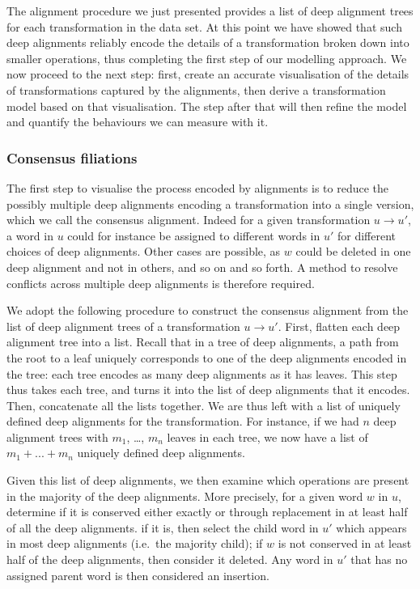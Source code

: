 The alignment procedure we just presented provides a list of deep
alignment trees for each transformation in the data set. At this point
we have showed that such deep alignments reliably encode the details of
a transformation broken down into smaller operations, thus completing
the first step of our modelling approach. We now proceed to the next
step: first, create an accurate visualisation of the details of
transformations captured by the alignments, then derive a transformation
model based on that visualisation. The step after that will then refine
the model and quantify the behaviours we can measure with it.

\subsubsection{Consensus filiations}\label{consensus-filiations}

The first step to visualise the process encoded by alignments is to
reduce the possibly multiple deep alignments encoding a transformation
into a single version, which we call the consensus alignment. Indeed for
a given transformation \(u \rightarrow u'\), a word in \(u\) could for
instance be assigned to different words in \(u'\) for different choices
of deep alignments. Other cases are possible, as \(w\) could be deleted
in one deep alignment and not in others, and so on and so forth. A
method to resolve conflicts across multiple deep alignments is therefore
required.

We adopt the following procedure to construct the consensus alignment
from the list of deep alignment trees of a transformation
\(u \rightarrow u'\). First, flatten each deep alignment tree into a
list. Recall that in a tree of deep alignments, a path from the root to
a leaf uniquely corresponds to one of the deep alignments encoded in the
tree: each tree encodes as many deep alignments as it has leaves. This
step thus takes each tree, and turns it into the list of deep alignments
that it encodes. Then, concatenate all the lists together. We are thus
left with a list of uniquely defined deep alignments for the
transformation. For instance, if we had \(n\) deep alignment trees with
\(m_1\), \ldots{}, \(m_n\) leaves in each tree, we now have a list of
\(m_1 + ... + m_n\) uniquely defined deep alignments.

Given this list of deep alignments, we then examine which operations are
present in the majority of the deep alignments. More precisely, for a
given word \(w\) in \(u\), determine if it is conserved either exactly
or through replacement in at least half of all the deep alignments. if
it is, then select the child word in \(u'\) which appears in most deep
alignments (i.e.~the majority child); if \(w\) is not conserved in at
least half of the deep alignments, then consider it deleted. Any word in
\(u'\) that has no assigned parent word is then considered an insertion.

